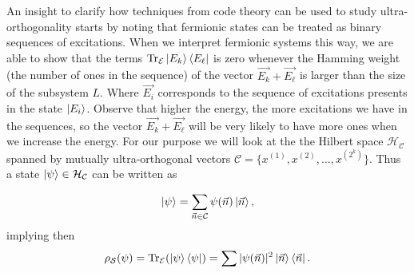 \indent An insight to clarify how techniques from code theory can be used to study ultra-orthogonality starts by noting that fermionic states can be treated as binary sequences of excitations. When we interpret fermionic systems this way, we are able to show that the terms $\operatorname{Tr}_{\mathcal{E}} \mathinner{|{E_k}\rangle}\mathinner{\langle{E_\ell}|} $ is zero whenever the Hamming weight (the number of ones in the sequence) of the vector $\vec{E_k}+\vec{E_\ell}$ is larger than the size of the subsystem $L$. Where $\vec{E_i}$ corresponds to the sequence of excitations presents in the state $ \mathinner{|{E_i}\rangle}$. Observe that higher the energy, the more excitations we have in the sequences, so the vector $\vec{E_k}+\vec{E_\ell}$ will be very likely to have more ones when we increase the energy. For our purpose we will look at the the Hilbert space $\mathcal{H}_{\mathcal{C}}$ spanned by mutually ultra-orthogonal vectors $\mathcal{C}=\{x^{(1)},x^{(2)},\ldots, x^{(2^k)}\}$. Thus a state $\mathinner{|{\psi}\rangle}\in \mathcal{H}_{\mathcal{C}}$ can be written as

\begin{equation}
\mathinner{|{\psi}\rangle} = \sum_{\vec{n}\in \mathcal{C}}\psi(\vec{n})\mathinner{|{\vec{n}}\rangle},
\end{equation}
implying then
\begin{equation}
\rho_{\mathcal{S}}(\psi) = \operatorname{Tr}_{\mathcal{E}}(\mathinner{|{\psi}\rangle}\mathinner{\langle{\psi}|}) = \sum |\psi(\vec{n})|^2 \mathinner{|{\vec{n}}\rangle}\mathinner{\langle{\vec{n}}|}.
\end{equation}

